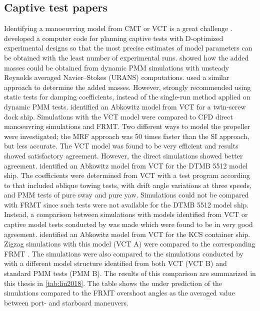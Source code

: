 \subsection{Captive test papers} \label{sec:CT}
Identifying a manoeuvring model from CMT or VCT is a great challenge  \cite{sutuloAlgorithmOfflineIdentification2014}.
\textcite{sutuloSynthesisExperimentalDesigns2004} developed a computer code for planning captive tests with D-optimized experimental designs so that the most precise estimates of model parameters can be obtained with the least number of experimental runs.
\textcite{sakamotoURANSSimulationsStatic2012} showed how the added masses could be obtained from dynamic PMM simulations with unsteady Reynolds averaged Navier–Stokes (URANS) computations. \textcite{elmoctarRANSBasedSimulatedShip2014} used a similar approach to determine the added masses. 
However, \textcite{sakamotoURANSSimulationsStatic2012} strongly recommended using static tests for damping coefficients, instead of the single-run method applied on dynamic PMM tests.
\textcite{elmoctarRANSBasedSimulatedShip2014} identified an Abkowitz model from VCT for a twin-screw dock ship. Simulations with the VCT model were compared to CFD direct manoeuvring simulations and FRMT. Two different ways to model the propeller were investigated; the MRF approach was 50 times faster than the SI approach, but less accurate. The VCT model was found to be very efficient and results showed satisfactory agreement. However, the direct simulations showed better agreement.
\textcite{hajivandVirtualSimulationManeuvering2015} identified an Abkowitz model from VCT for the DTMB 5512 model ship. The coefficients were determined from VCT with a test program according to \textcite{yoonBenchmarkCFDValidation2015c} that included oblique towing tests, with drift angle variations at three speeds, and PMM tests of pure sway and pure yaw.
Simulations could not be compared with FRMT since such tests were not available for the DTMB 5512 model ship. 
Instead, a comparison between simulations with models identified from VCT or captive model tests conducted by \textcite{yoonBenchmarkCFDValidation2015c} was made which were found to be in very good agreement.
\textcite{liuPredictionsShipManeuverability2018} identified an Abkowitz model from VCT for the KCS container ship. Zigzag simulations with this model (VCT A) were compared to the corresponding FRMT \cite{simmanWorkshopVerificationValidation2014}. The simulations were also compared to the simulations conducted by \textcite{simonsenKCSPMMTests2014} with a different model structure identified from both VCT (VCT B) and standard PMM tests (PMM B). The results of this comparison are summarized in this thesis in \autoref{tab:liu2018}. The table shows the under prediction of the simulations compared to the FRMT overshoot angles as the averaged value between port- and starboard maneuvers. 
